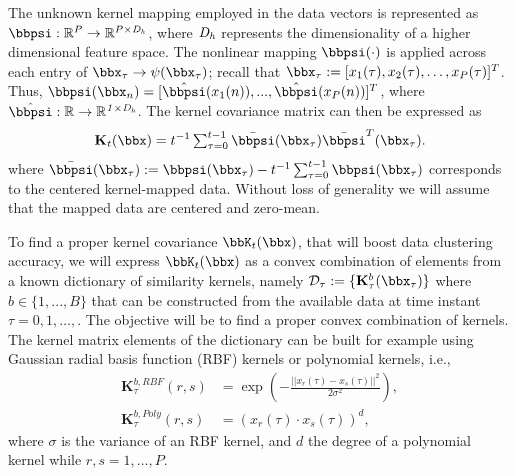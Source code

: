 \documentclass[10pt,final]{IEEEtran}
\begin{document}
The unknown kernel mapping employed in the data vectors is represented as $\bbpsi : \mathbb{R}^{P} \rightarrow  \mathbb{R}^{P \times \it{D_h}}$, where $\it{D_h}$ represents the dimensionality of a higher dimensional feature space. The nonlinear mapping $\bbpsi(\cdot)$ is applied across each entry of  ${\bbx}_{\tau} \rightarrow \psi(\bbx_{\tau})$; recall that  $\bbx_{\tau}:=[x_1(\tau),x_2(\tau),\ldots,x_P(\tau)]^T$. Thus, $\bbpsi(\bbx_{n}) = [\hat\bbpsi({x_1(n)}), ...,\hat\bbpsi({x_{P}(n)})]^T$, where $\hat\bbpsi  : \mathbb{R} \rightarrow  \mathbb{R}^{\it{1\times D_h}}$. The kernel covariance matrix can then be expressed as 
%
\begin{align}
\label{eq:Kernel_Matrices1}
{\mathbf{K}}_{t}(\bbx) = t^{-1} \textstyle\sum_{\tau =0}^{t-1} \bar{\bbpsi}(\bbx_{\tau})\bar{\bbpsi}^{T}(\bbx_{\tau}).
\end{align}
%
where $\bar{\bbpsi}(\bbx_{\tau}):={\bbpsi}(\bbx_{\tau})-t^{-1}\textstyle\sum_{\tau=0}^{t-1}{\bbpsi}(\bbx_{\tau})$ corresponds to the centered kernel-mapped data. Without loss of generality we will assume that the mapped data are centered and zero-mean. 

To find a proper kernel covariance $\bbK_{t}(\bbx)$, that will boost data clustering accuracy, we will express $\bbK_{t}(\bbx)$ as a convex combination of elements from a known dictionary  of similarity kernels, namely ${\cal D}_{\tau}:=\{{\mathbf{K}}_{\tau}^b(\bbx_{\tau})\}$ where 
$b \in \{1, ..., B\}$ that can be constructed from the available data at time instant $\tau=0,1,\ldots,$. The objective will be to find a proper convex combination of kernels. The kernel matrix elements of the dictionary can be built for example using Gaussian radial basis function (RBF) kernels or polynomial kernels, i.e.,
\begin{align}\label{eq:RBF}
\mathbf{K}_{\tau}^{b,RBF}(r,s) &= \exp\left(-\frac{||{x}_{r}(\tau)-{x}_{s}(\tau)||^2}{2\sigma^{2}}\right),\nonumber \\
\mathbf{K}_{\tau}^{b,Poly}(r,s)&= ({x}_r(\tau)\cdot x_s(\tau))^d,
\end{align}
where $\sigma$ is the variance of an RBF kernel, and $d$ the degree of a polynomial kernel while $r,s=1,\ldots,P$.
\end{document}
